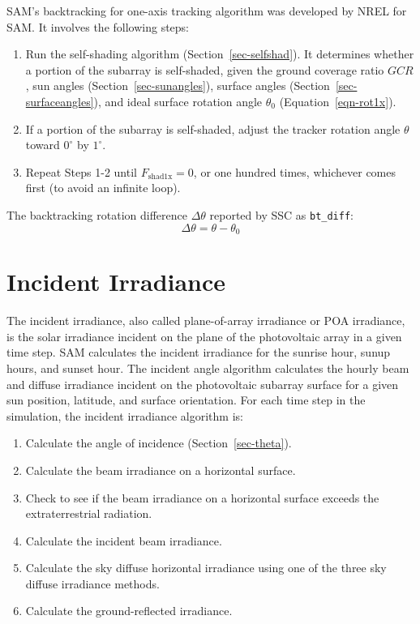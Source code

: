 \documentclass[12pt,letterpaper]{article}
\newcommand\GCR{\ensuremath{\mathit{GCR}}}
\begin{document}
SAM's backtracking for one-axis tracking algorithm was developed by NREL for SAM. It involves the following steps:
\begin{enumerate}
\item Run the self-shading algorithm (Section~\ref{sec-selfshad}). It determines whether a portion of the subarray is self-shaded, given the ground coverage ratio $\GCR$, sun angles (Section~\ref{sec-sunangles}), surface angles (Section~\ref{sec-surfaceangles}), and ideal surface rotation angle $\theta_0$ (Equation~\ref{eqn-rot1x}).
\item If a portion of the subarray is self-shaded, adjust the tracker rotation angle $\theta$ toward $0^\circ$ by $1^\circ$.
\item Repeat Steps 1-2 until $F_{\mathrm{shad1x}}=0$, or one hundred times, whichever comes first (to avoid an infinite loop).
\end{enumerate}

The backtracking rotation difference $\Delta\theta$ reported by SSC as \texttt{bt\_diff}:
\begin{equation}
\Delta\theta = \theta - \theta_0
\end{equation}

\chapter{Incident Irradiance}\label{sec-incidentirradiance}

The incident irradiance, also called plane-of-array irradiance or POA irradiance, is the solar irradiance incident on the plane of the photovoltaic array in a given time step. SAM calculates the incident irradiance for the sunrise hour, sunup hours, and sunset hour. The incident angle algorithm calculates the hourly beam and diffuse irradiance incident on the photovoltaic subarray surface for a given sun position, latitude, and surface orientation. For each  time step in the simulation, the incident irradiance algorithm is:

\begin{enumerate}
\item Calculate the angle of incidence (Section~\ref{sec-theta}).
\item Calculate the beam irradiance on a horizontal surface.
\item Check to see if the beam irradiance on a horizontal surface exceeds the extraterrestrial radiation.
\item Calculate the incident beam irradiance.
\item Calculate the sky diffuse horizontal irradiance using one of the three sky diffuse irradiance methods.
\item Calculate the ground-reflected irradiance.
\end{enumerate}
\end{document}
